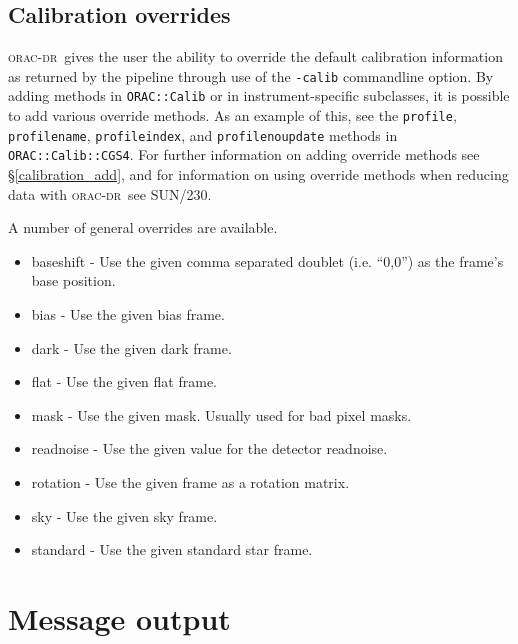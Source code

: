\documentclass[twoside,11pt]{article}
\renewcommand{\_}{\texttt{\symbol{95}}}
\newcommand{\Oracdr}{\textsc{orac-dr}}
\begin{document}
\subsection{Calibration overrides}

\Oracdr\ gives the user the ability to override the default calibration
information as returned by the pipeline through use of the \texttt{-calib}
commandline option. By adding methods in \texttt{ORAC::Calib} or in
instrument-specific subclasses, it is possible to add various override
methods. As an example of this, see the \texttt{profile}, \texttt{profilename},
\texttt{profileindex}, and \texttt{profilenoupdate} methods in
\texttt{ORAC::Calib::CGS4}. For further information on adding override
methods see \S\ref{calibration_add}, and for information on using
override methods when reducing data with \Oracdr\ see SUN/230.

A number of general overrides are available. 

\begin{itemize}

\item baseshift - Use the given comma separated doublet (i.e. ``0,0'') as the
frame's base position.

\item bias - Use the given bias frame.

\item dark - Use the given dark frame.

\item flat - Use the given flat frame.

\item mask - Use the given mask. Usually used for bad pixel masks.

\item readnoise - Use the given value for the detector readnoise.

\item rotation - Use the given frame as a rotation matrix.

\item sky - Use the given sky frame.

\item standard - Use the given standard star frame.

\end{itemize}

\section{Message output}
\end{document}
